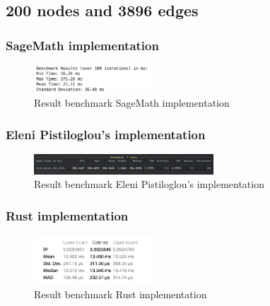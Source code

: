 \newpage


\subsection{200 nodes and 3896 edges}\label{subsec:result-for-graphs-200-3896}

\subsubsection*{SageMath implementation}
\begin{figure}[!h]
    \centering
    \includegraphics[width=0.40\textwidth]{images/benchmark/graph_200_3896/benchmark_graph_200_3896_sagemath}
    \caption{Result benchmark SageMath implementation}
    \label{fig:benchmark-graph-200-3896-sagemath}
\end{figure}

\subsubsection*{Eleni Pistiloglou's implementation}
\begin{figure}[!h]
    \centering
    \includegraphics[width=0.60\textwidth]{images/benchmark/graph_200_3896/benchmark_graph_200_3996_python}
    \caption{Result benchmark Eleni Pistiloglou's implementation}
    \label{fig:benchmark-graph-200-3896-python}
\end{figure}

\subsubsection*{Rust implementation}
\begin{figure}[!h]
    \centering
    \includegraphics[width=0.40\textwidth]{images/benchmark/graph_200_3896/benchmark_graph_200_3996_rust}
    \caption{Result benchmark Rust implementation}
    \label{fig:benchmark-graph-200-3896-rust}
\end{figure}

